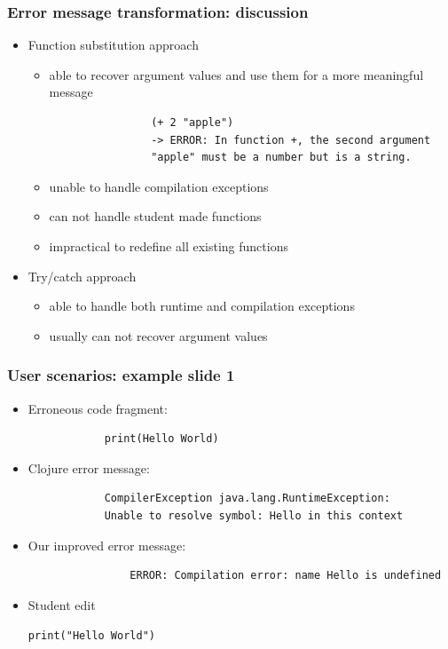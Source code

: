 \documentclass{beamer}
\begin{document}
\begin{frame}[fragile]
\frametitle{Error message transformation: discussion}

	\begin{itemize}
		\item Function substitution approach
			\begin{itemize}
				\item able to recover argument values and use them for a more meaningful message
				\begin{verbatim}
				(+ 2 "apple")
				-> ERROR: In function +, the second argument
				"apple" must be a number but is a string.
				\end{verbatim}
				\item unable to handle compilation exceptions
				\item can not handle student made functions
				\item impractical to redefine all existing functions
			\end{itemize}
		\item Try/catch approach
			\begin{itemize}
	 			\item able to handle both runtime and compilation exceptions
				\item usually can not recover argument values
	 		\end{itemize} 
	\end{itemize}
\end{frame}

\begin{frame}[fragile]
\frametitle{User scenarios: example slide 1}

	\begin{itemize}
		\item Erroneous code fragment:
			\begin{verbatim}
			print(Hello World)
			\end{verbatim}
			
		\item Clojure error message:
			\begin{verbatim}
			CompilerException java.lang.RuntimeException:
			Unable to resolve symbol: Hello in this context
			\end{verbatim}
			
		\item Our improved error message:
			\begin{verbatim}
				ERROR: Compilation error: name Hello is undefined
			\end{verbatim}
			
		\item Student edit
		
				\texttt{print(\alert{"Hello World"})}
	\end{itemize}
	
\end{frame}
\end{document}
